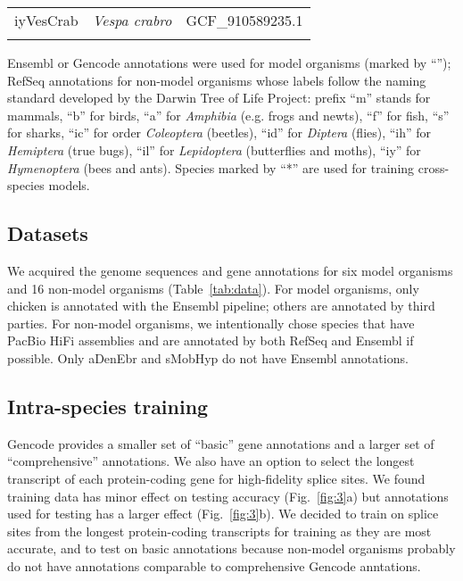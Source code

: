 \documentclass[webpdf,contemporary,large,namedate]{oup-authoring-template}%
\begin{document}
\begin{table}[!tb]
\begin{tabular*}{\columnwidth}{@{\extracolsep\fill}lll@{\extracolsep\fill}}
iyVesCrab      & \emph{Vespa crabro}               & GCF\_910589235.1 \\
\botrule
\end{tabular*}
\begin{tablenotes}\setlength\itemsep{0.0em}
Ensembl or Gencode annotations were used for model organisms (marked by ``\dag'');
RefSeq annotations for non-model organisms whose labels
follow the naming standard developed by the Darwin Tree of Life Project:
prefix ``m'' stands for mammals,
``b'' for birds,
``a'' for \emph{Amphibia} (e.g. frogs and newts),
``f'' for fish,
``s'' for sharks,
``ic'' for order \emph{Coleoptera} (beetles),
``id'' for \emph{Diptera} (flies),
``ih'' for \emph{Hemiptera} (true bugs),
``il'' for \emph{Lepidoptera} (butterflies and moths),
``iy'' for \emph{Hymenoptera} (bees and ants).
Species marked by ``*'' are used for training cross-species models.
\end{tablenotes}
\end{table}

\subsection{Datasets}

We acquired the genome sequences and gene annotations for six model organisms and 16 non-model organisms (Table~\ref{tab:data}).
For model organisms, only chicken is annotated with the Ensembl pipeline;
others are annotated by third parties.
For non-model organisms, we intentionally chose species that have PacBio HiFi assemblies
and are annotated by both RefSeq and Ensembl if possible.
Only aDenEbr and sMobHyp do not have Ensembl annotations.

\subsection{Intra-species training}

Gencode provides a smaller set of ``basic'' gene annotations and a larger set of ``comprehensive'' annotations.
We also have an option to select the longest transcript of each protein-coding gene for high-fidelity splice sites.
We found training data has minor effect on testing accuracy (Fig.~\ref{fig:3}a)
but annotations used for testing has a larger effect (Fig.~\ref{fig:3}b).
We decided to train on splice sites from the longest protein-coding transcripts for training as they are most accurate,
and to test on basic annotations because non-model organisms probably do not have annotations comparable to comprehensive Gencode anntations.
\end{document}
